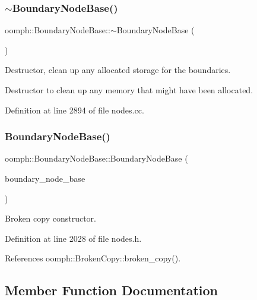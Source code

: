 \subsubsection{\texorpdfstring{$\sim$\+Boundary\+Node\+Base()}{~BoundaryNodeBase()}}
{\footnotesize\ttfamily oomph\+::\+Boundary\+Node\+Base\+::$\sim$\+Boundary\+Node\+Base (\begin{DoxyParamCaption}{ }\end{DoxyParamCaption})\hspace{0.3cm}{\ttfamily [virtual]}}



Destructor, clean up any allocated storage for the boundaries. 

Destructor to clean up any memory that might have been allocated. 

Definition at line 2894 of file nodes.\+cc.

\mbox{\label{classoomph_1_1BoundaryNodeBase_ab74b97befa6f30698c3c3a1afd126711}} 
\subsubsection{\texorpdfstring{Boundary\+Node\+Base()}{BoundaryNodeBase()}\hspace{0.1cm}{\footnotesize\ttfamily [2/2]}}
{\footnotesize\ttfamily oomph\+::\+Boundary\+Node\+Base\+::\+Boundary\+Node\+Base (\begin{DoxyParamCaption}\item[{const \hyperlink{classoomph_1_1BoundaryNodeBase}{Boundary\+Node\+Base} \&}]{boundary\+\_\+node\+\_\+base }\end{DoxyParamCaption})\hspace{0.3cm}{\ttfamily [inline]}}



Broken copy constructor. 



Definition at line 2028 of file nodes.\+h.



References oomph\+::\+Broken\+Copy\+::broken\+\_\+copy().



\subsection{Member Function Documentation}
\mbox{\label{classoomph_1_1BoundaryNodeBase_a3f909fc5f583bcfa5838766769448343}} 
